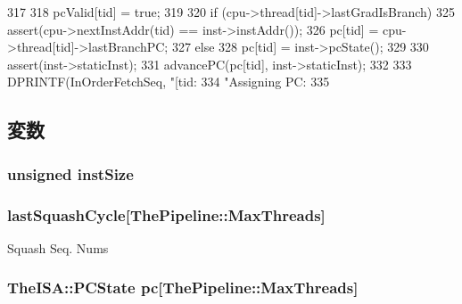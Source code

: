 \begin{DoxyCode}
317 {
318     pcValid[tid] = true;
319 
320     if (cpu->thread[tid]->lastGradIsBranch) {
325         assert(cpu->nextInstAddr(tid) == inst->instAddr());
326         pc[tid] = cpu->thread[tid]->lastBranchPC;
327     } else {
328         pc[tid] = inst->pcState();
329     }
330     assert(inst->staticInst);
331     advancePC(pc[tid], inst->staticInst);
332     
333     DPRINTF(InOrderFetchSeq, "[tid:%
334             "Assigning  PC: %
335 }
\end{DoxyCode}


\subsection{変数}
\hypertarget{classFetchSeqUnit_ae3208e633eb913a59f8a49ba2c65840c}{
\subsubsection[{instSize}]{\setlength{\rightskip}{0pt plus 5cm}unsigned {\bf instSize}}}
\label{classFetchSeqUnit_ae3208e633eb913a59f8a49ba2c65840c}
\hypertarget{classFetchSeqUnit_a07ac7fa00a59be2904eaa76d4735681e}{
\subsubsection[{lastSquashCycle}]{ {\bf lastSquashCycle}\mbox{[}{\bf ThePipeline::MaxThreads}\mbox{]}}}
\label{classFetchSeqUnit_a07ac7fa00a59be2904eaa76d4735681e}
Squash Seq. Nums \hypertarget{classFetchSeqUnit_a61bb24b7355c86288cba2cd9d51ad1ed}{
\subsubsection[{pc}]{\setlength{\rightskip}{0pt plus 5cm}TheISA::PCState {\bf pc}\mbox{[}{\bf ThePipeline::MaxThreads}\mbox{]}}}
